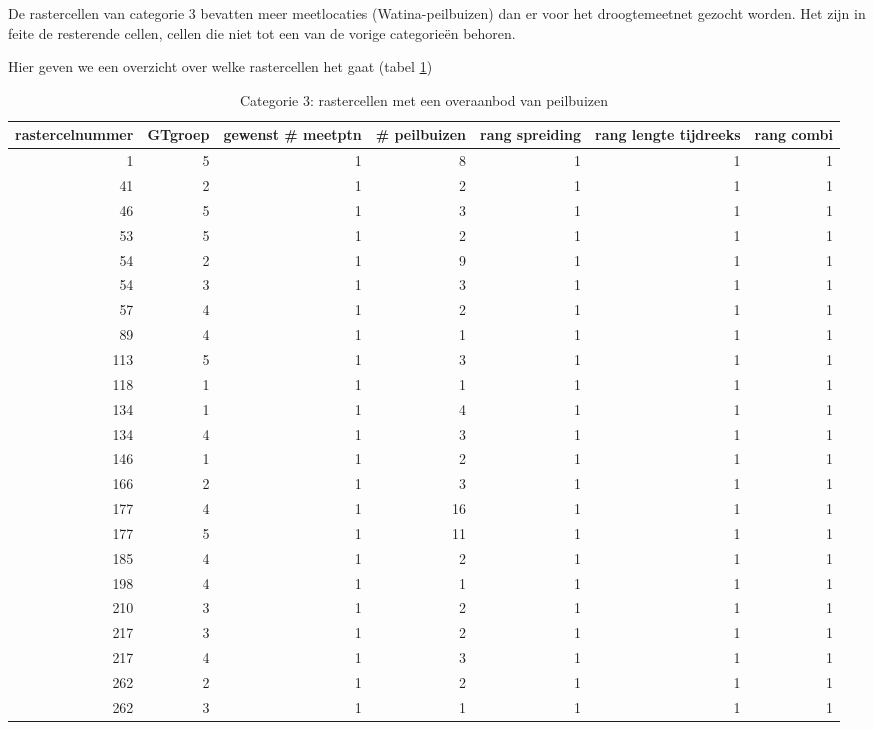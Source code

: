 \documentclass[11pt,]{book}
\begin{document}
De rastercellen van categorie 3 bevatten meer meetlocaties
(Watina-peilbuizen) dan er voor het droogtemeetnet gezocht worden. Het
zijn in feite de resterende cellen, cellen die niet tot een van de
vorige categorieën behoren.

Hier geven we een overzicht over welke rastercellen het gaat (tabel
\ref{tab:cat3-table})

\begin{table}

\caption{\label{tab:cat3-table}Categorie 3: rastercellen met een overaanbod van peilbuizen}
\centering
\begin{tabular}[t]{r|r|r|r|r|r|r}
\hline
rastercelnummer & GTgroep & gewenst \# meetptn & \# peilbuizen & rang spreiding & rang lengte tijdreeks & rang combi\\
\hline
1 & 5 & 1 & 8 & 1 & 1 & 1\\
\hline
41 & 2 & 1 & 2 & 1 & 1 & 1\\
\hline
46 & 5 & 1 & 3 & 1 & 1 & 1\\
\hline
53 & 5 & 1 & 2 & 1 & 1 & 1\\
\hline
54 & 2 & 1 & 9 & 1 & 1 & 1\\
\hline
54 & 3 & 1 & 3 & 1 & 1 & 1\\
\hline
57 & 4 & 1 & 2 & 1 & 1 & 1\\
\hline
89 & 4 & 1 & 1 & 1 & 1 & 1\\
\hline
113 & 5 & 1 & 3 & 1 & 1 & 1\\
\hline
118 & 1 & 1 & 1 & 1 & 1 & 1\\
\hline
134 & 1 & 1 & 4 & 1 & 1 & 1\\
\hline
134 & 4 & 1 & 3 & 1 & 1 & 1\\
\hline
146 & 1 & 1 & 2 & 1 & 1 & 1\\
\hline
166 & 2 & 1 & 3 & 1 & 1 & 1\\
\hline
177 & 4 & 1 & 16 & 1 & 1 & 1\\
\hline
177 & 5 & 1 & 11 & 1 & 1 & 1\\
\hline
185 & 4 & 1 & 2 & 1 & 1 & 1\\
\hline
198 & 4 & 1 & 1 & 1 & 1 & 1\\
\hline
210 & 3 & 1 & 2 & 1 & 1 & 1\\
\hline
217 & 3 & 1 & 2 & 1 & 1 & 1\\
\hline
217 & 4 & 1 & 3 & 1 & 1 & 1\\
\hline
262 & 2 & 1 & 2 & 1 & 1 & 1\\
\hline
262 & 3 & 1 & 1 & 1 & 1 & 1\\
\hline

\end{tabular}
\end{table}
\end{document}

